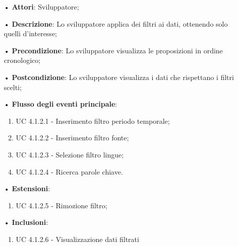 \begin{itemize}
\item[•]\textbf{Attori}: Sviluppatore;
\item[•]\textbf{Descrizione}: Lo sviluppatore applica dei filtri ai dati, ottenendo solo quelli d'interesse;
\item[•]\textbf{Precondizione}: Lo sviluppatore visualizza le proposizioni in ordine cronologico;
\item[•]\textbf{Postcondizione}: Lo sviluppatore visualizza i dati che rispettano i filtri scelti;
\item[•]\textbf{Flusso degli eventi principale}:
\begin{enumerate}
\item UC 4.1.2.1 - Inserimento filtro periodo temporale;
\item UC 4.1.2.2 - Inserimento filtro fonte;
\item UC 4.1.2.3 - Selezione filtro lingue;
\item UC 4.1.2.4 - Ricerca parole chiave.
\end{enumerate}
\item[•]\textbf{Estensioni}:
\begin{enumerate}
	\item UC 4.1.2.5 - Rimozione filtro;
\end{enumerate}
\item[•]\textbf{Inclusioni}:
\begin{enumerate}
\item UC 4.1.2.6 - Visualizzazione dati filtrati
\end{enumerate}
\end{itemize}

